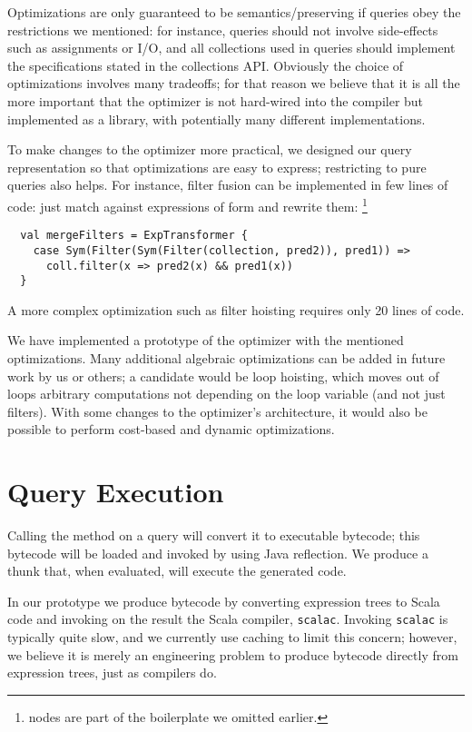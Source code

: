 Optimizations are only guaranteed to be semantics\-/preserving if queries obey the
restrictions we mentioned: for instance, queries should not involve
side-effects such as assignments or I/O, and all collections used in queries
should implement the specifications stated in the collections API\@. Obviously the choice of optimizations involves many tradeoffs; for that reason
we believe that it is all the more important that the optimizer is not
hard-wired into the compiler but implemented as a library, with potentially
many different implementations.

To make changes to the optimizer more practical, we designed our query
representation so that optimizations are easy to express; restricting to pure
queries also helps. For instance, filter fusion can be implemented in few lines of code:
just match against expressions of form 
and rewrite them:%
\footnote{ nodes are part of the boilerplate we omitted earlier.}
\begin{lstlisting}
  val mergeFilters = ExpTransformer {
    case Sym(Filter(Sym(Filter(collection, pred2)), pred1)) =>
      coll.filter(x => pred2(x) && pred1(x))
  }
\end{lstlisting}
A more complex
optimization such as filter hoisting requires only 20 lines of code.

We have implemented a prototype of the optimizer with the mentioned
optimizations. Many additional algebraic optimizations can be added in future
work by us or others; a candidate would be loop hoisting, which moves out of
loops arbitrary computations not depending on the loop variable (and not just filters).
With some changes to the optimizer's architecture, it would also be possible to perform cost-based and dynamic optimizations.

\section{Query Execution}
\label{sec:execution}
Calling the  method on a query will convert it to executable
bytecode; this bytecode will be loaded and invoked by using Java reflection.
We produce a thunk that, when evaluated, will execute the
generated code.

In our prototype we produce bytecode by converting expression trees to
Scala code and invoking on the result the Scala compiler, \texttt{scalac}. Invoking
\texttt{scalac} is typically quite slow, and we currently use caching to limit
this concern; however, we believe it is merely an engineering problem to
produce bytecode directly from expression trees, just as compilers do.

